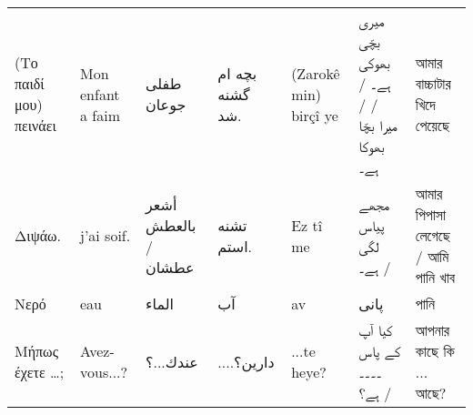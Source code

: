 \begin{longtable}{p{3.5cm} p{3.5cm} p{3.5cm} p{3.5cm} p{3.5cm} p{3.5cm} p{3.5cm} }
 (Το παιδί μου) πεινάει                                                                                                        & Mon enfant a faim                                                                               & طفلی جوعان                                                                            & بچه ام گشنه شد.                                             & (Zarokê min) birçî ye                                                              & میری بچّی بھوکی ہے۔ /  /   / میرا بچّا بھوکا ہے۔                               & আমার বাচ্চাটার খিদে পেয়েছে                                        \\
 Διψάω.                                                                                                                        & j'ai soif.                                                                                      & أشعر بالعطش      / عطشان                                                              & تشنه استم.                                                  & Ez tî me                                                                           & مجھے پیاس لگی ہے۔ /                                                            & আমার পিপাসা লেগেছে / আমি পানি খাব                                 \\
 Νερό                                                                                                                          & eau                                                                                             & الماء                                                                                 & آب                                                          & av                                                                                 & پانی                                                                           & পানি                                                              \\
 Μήπως έχετε …;                                                                                                                & Avez-vous...?                                                                                   & عندك...؟                                                                              & ....دارین؟                                                  & ...te heye?                                                                        & کیا آپ کے پاس ۔۔۔۔ ہے؟ /                                                      & আপনার কাছে কি ... আছে?                                            \\

\end{longtable}
